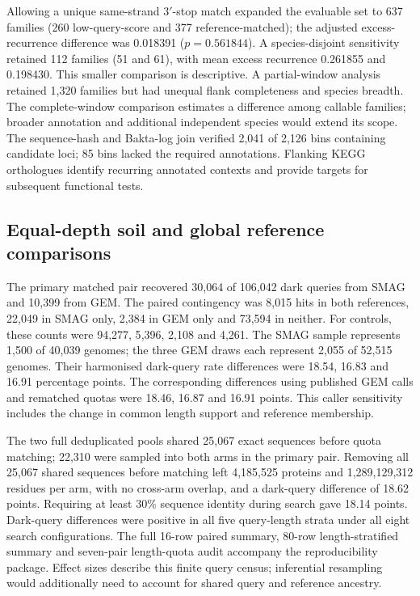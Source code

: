 \documentclass[11pt]{article}
\begin{document}
Allowing a unique same-strand 3$'$-stop match expanded the evaluable set to 637 families
(260 low-query-score and 377 reference-matched); the adjusted excess-recurrence difference
was 0.018391 ($p=0.561844$). A species-disjoint sensitivity retained 112 families
(51 and 61), with mean excess recurrence 0.261855 and 0.198430. This smaller comparison is
descriptive. A partial-window analysis retained 1{,}320 families but had unequal flank
completeness and species breadth. The complete-window comparison estimates a difference among
callable families; broader annotation and additional independent species would extend its scope.
The sequence-hash and Bakta-log join verified 2{,}041 of 2{,}126 bins containing candidate loci;
85 bins lacked the required annotations. Flanking KEGG orthologues identify recurring annotated
contexts and provide targets for subsequent functional tests.

\subsection*{Equal-depth soil and global reference comparisons}
The primary matched pair recovered 30{,}064 of 106{,}042 dark queries from SMAG and 10{,}399
from GEM. The paired contingency was 8{,}015 hits in both references, 22{,}049 in SMAG only,
2{,}384 in GEM only and 73{,}594 in neither. For controls, these counts were 94{,}277,
5{,}396, 2{,}108 and 4{,}261. The SMAG sample represents 1{,}500 of 40{,}039 genomes;
the three GEM draws each represent 2{,}055 of 52{,}515 genomes. Their harmonised dark-query
rate differences were 18.54, 16.83 and 16.91 percentage points. The corresponding differences
using published GEM calls and rematched quotas were 18.46, 16.87 and 16.91 points.
This caller sensitivity includes the change in common length support and reference membership.

The two full deduplicated pools shared 25{,}067 exact sequences before quota matching;
22{,}310 were sampled into both arms in the primary pair. Removing all 25{,}067 shared sequences
before matching left 4{,}185{,}525 proteins and 1{,}289{,}129{,}312 residues per arm, with no
cross-arm overlap, and a dark-query difference of 18.62 points. Requiring at least 30\%
sequence identity during search gave 18.14 points. Dark-query differences were positive in
all five query-length strata under all eight search configurations. The full 16-row paired
summary, 80-row length-stratified summary and seven-pair length-quota audit accompany the
reproducibility package. Effect sizes describe this finite query census; inferential
resampling would additionally need to account for shared query and reference ancestry.
\end{document}
